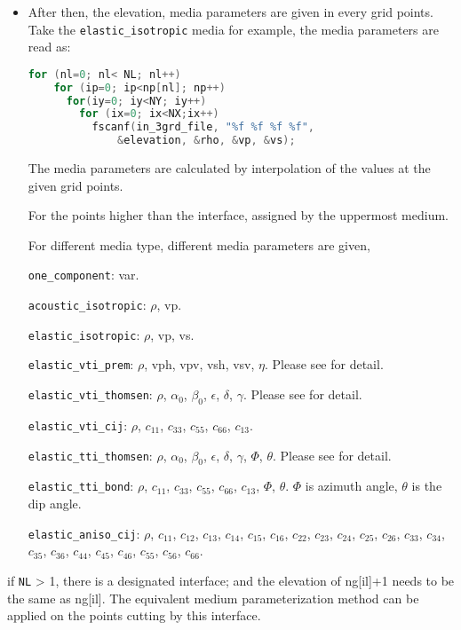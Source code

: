 \begin{itemize}
 \item {
  After then, the elevation, media parameters are given in every grid points. Take the \texttt{elastic\_isotropic} media for example, the media parameters are read as:
  \begin{lstlisting}[language = C]
  for (nl=0; nl< NL; nl++)
    for (ip=0; ip<np[nl]; np++)
      for(iy=0; iy<NY; iy++)
        for (ix=0; ix<NX;ix++)
          fscanf(in_3grd_file, "%f %f %f %f", 
              &elevation, &rho, &vp, &vs);
  \end{lstlisting}
 } 

The media parameters are calculated by interpolation of the values at the given grid points.

For the points higher than the interface, assigned by the uppermost medium. 

For different media type, different media parameters are given,

\texttt{one\_component}: var.

\texttt{acoustic\_isotropic}: $\rho$, vp.

\texttt{elastic\_isotropic}: $\rho$, vp, vs.

\texttt{elastic\_vti\_prem}: $\rho$, vph, vpv, vsh, vsv, $\eta$. Please see \citep{dziewonski1981preliminary} for detail.

\texttt{elastic\_vti\_thomsen}: $\rho$, $\alpha_0$, $\beta_0$, $\epsilon$, $\delta$, $\gamma$. Please see \citep{thomsen1986weak} for detail.

\texttt{elastic\_vti\_cij}: $\rho$, $c_{11}$, $c_{33}$, $c_{55}$, $c_{66}$, $c_{13}$. 

\texttt{elastic\_tti\_thomsen}: $\rho$, $\alpha_0$, $\beta_0$, $\epsilon$, $\delta$, $\gamma$, $\Phi$, $\theta$. Please see \citep{thomsen1986weak} for detail.

\texttt{elastic\_tti\_bond}: $\rho$, $c_{11}$, $c_{33}$, $c_{55}$, $c_{66}$, $c_{13}$, $\Phi$, $\theta$. $\Phi$ is azimuth angle, $\theta$ is the dip angle.

\texttt{elastic\_aniso\_cij}: $\rho$, $c_{11}$, $c_{12}$, $c_{13}$, $c_{14}$, $c_{15}$, $c_{16}$,  
                                      $c_{22}$, $c_{23}$, $c_{24}$, $c_{25}$, $c_{26}$, 
                                      $c_{33}$, $c_{34}$, $c_{35}$, $c_{36}$, $c_{44}$,
                                      $c_{45}$, $c_{46}$, $c_{55}$, $c_{56}$, $c_{66}$.
\end{itemize}
if \texttt{NL} > 1, there is a designated interface; and the elevation of ng[il]+1 needs to be the same as ng[il]. The equivalent medium parameterization method can be applied on the points cutting by this interface.

